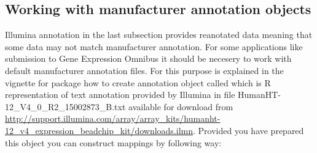 \subsection{Working with manufacturer annotation objects}
Illumina annotation in the last subsection provides reanotated data meaning that some data may not match manufacturer annotation. For some applications like submission to Gene Expression Omnibus it should be necesery to work with default manufacturer annotation files. For this purpose is explained in the vignette for  package how to create annotation object called  which is R representation of text annotation provided by Illumina in file HumanHT-12\_V4\_0\_R2\_15002873\_B.txt available for download from \url{http://support.illumina.com/array/array\_kits/humanht-12\_v4\_expression\_beadchip\_kit/downloads.ilmn}. Provided you have prepared this object you can construct mappings by following way:
